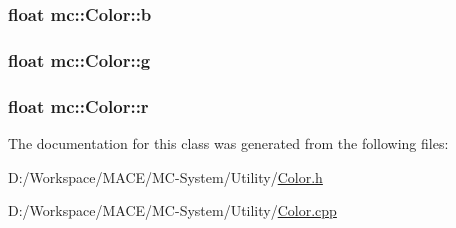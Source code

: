 \subsubsection[{\texorpdfstring{b}{b}}]{\setlength{\rightskip}{0pt plus 5cm}float mc\+::\+Color\+::b}\hypertarget{classmc_1_1_color_afd537e7822ea1674f3f66db22b343ec0}{}\label{classmc_1_1_color_afd537e7822ea1674f3f66db22b343ec0}
\subsubsection[{\texorpdfstring{g}{g}}]{\setlength{\rightskip}{0pt plus 5cm}float mc\+::\+Color\+::g}\hypertarget{classmc_1_1_color_a16c106a491d5ab2deef17a0a5f4c0a95}{}\label{classmc_1_1_color_a16c106a491d5ab2deef17a0a5f4c0a95}
\subsubsection[{\texorpdfstring{r}{r}}]{\setlength{\rightskip}{0pt plus 5cm}float mc\+::\+Color\+::r}\hypertarget{classmc_1_1_color_a21e476d9238f36f210f5cd35868b3d08}{}\label{classmc_1_1_color_a21e476d9238f36f210f5cd35868b3d08}


The documentation for this class was generated from the following files\+:\begin{DoxyCompactItemize}
\item 
D\+:/\+Workspace/\+M\+A\+C\+E/\+M\+C-\/\+System/\+Utility/\hyperlink{_color_8h}{Color.\+h}\item 
D\+:/\+Workspace/\+M\+A\+C\+E/\+M\+C-\/\+System/\+Utility/\hyperlink{_color_8cpp}{Color.\+cpp}\end{DoxyCompactItemize}
